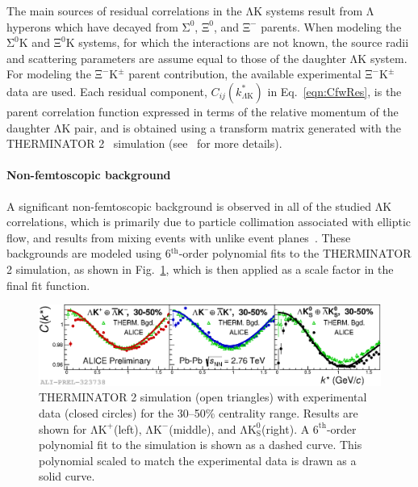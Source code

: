 \documentclass{svproc}
\newcommand{\Lam}{$\mathrm{\Lambda}$\xspace}
\newcommand{\LamK}{$\mathrm{\Lambda}\mathrm{K}$\xspace}
\newcommand{\LamKchP}{$\mathrm{\Lambda}\mathrm{K^{+}}$\xspace}
\newcommand{\LamKchM}{$\mathrm{\Lambda}\mathrm{K^{-}}$\xspace}
\newcommand{\LamKs}{$\mathrm{\Lambda}\mathrm{K^{0}_{S}}$\xspace}
\newcommand{\XiKpm}{$\mathrm{\Xi}^{-}\mathrm{K^{\pm}}$\xspace}
\begin{document}
The main sources of residual correlations in the \LamK systems result from \Lam hyperons which have decayed from $\mathrm{\Sigma}^{0}$, $\mathrm{\Xi}^{0}$, and $\mathrm{\Xi}^{-}$ parents.
When modeling the $\mathrm{\Sigma}^{0}$K and $\mathrm{\Xi}^{0}$K systems, for which the interactions are not known, the source radii and scattering parameters are assume equal to those of the daughter \LamK system.
For modeling the \XiKpm parent contribution, the available experimental \XiKpm data are used.
Each residual component, $C_{ij}(k^{*}_{\Lambda\mathrm{K}})$ in Eq.~\ref{eqn:CfwRes}, is the parent correlation function expressed in terms of the relative momentum of the daughter \LamK pair, and is obtained using a transform matrix generated with the THERMINATOR 2~\cite{Chojnacki:2011hb} simulation (see~\cite{Kisiel:2014mma} for more details).



\paragraph{Non-femtoscopic background}
\label{NonFlatBackground}


A significant non-femtoscopic background is observed in all of the studied \LamK correlations, which is primarily due to particle collimation associated with elliptic flow, and results from mixing events with unlike event planes~\cite{Kisiel:2017}.
These backgrounds are modeled using 6$^{\mathrm{th}}$-order polynomial fits to the THERMINATOR 2 simulation, as shown in Fig.~\ref{fig:BgdswTHERM}, which is then applied as a scale factor in the final fit function.


\begin{figure}[h]
  \centering
  \includegraphics[width=\textwidth]{./2019-06-11-BgdwFitOnly_RandomEPs_NumWeight1_Full_AllAnwConj_3050.eps}
  \caption[Backgrounds with THERMINATOR 2]
  {
  THERMINATOR 2 simulation (open triangles) with experimental data (closed circles) for the 30--50\% centrality range.  
  Results are shown for \LamKchP (left), \LamKchM (middle), and \LamKs (right).
  A $6^{\mathrm{th}}$-order polynomial fit to the simulation is shown as a dashed curve.  
  This polynomial scaled to match the experimental data is drawn as a solid curve.
  }
  \label{fig:BgdswTHERM}
\end{figure} 
\end{document}

